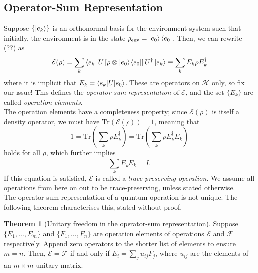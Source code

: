 \documentclass[12pt,a4paper]{report}
\numberwithin{equation}{section}
\newcommand{\ketbra}[2]{\ket{#1}\bra{#2}}
\newcommand{\ketbras}[1]{\ketbra{#1}{#1}}
\theoremstyle{definition}
\theoremstyle{theorem}
\newtheorem{theorem}{Theorem}[section]
\theoremstyle{theorem}
\theoremstyle{example}
\theoremstyle{definition}
\begin{document}
\subsection{Operator-Sum Representation}
Suppose $\{\ket{e_{k}}\}$ is an orthonormal basis for the environment system such that initially, the environment is in the state $\rho_{\text{env}}=\ketbras{e_{0}}$. Then, we can rewrite (??) as
\begin{equation}
	\mathcal{E}(\rho)=\sum_{k}\bra{e_{k}}U\left[\rho\otimes\ketbras{e_{0}}\right]U^{\dagger}\ket{e_{k}}\equiv\sum_{k}E_{k}\rho E_{k}^{\dagger}
\end{equation}
where it is implicit that $E_{k}=\braket{e_{k}|U|e_{0}}$. These are operators on $\mathcal{H}$ only, so fix our issue! This defines the \textit{operator-sum representation} of $\mathcal{E}$, and the set $\{E_{k}\}$ are called \textit{operation elements}.\\
The operation elements have a completeness property; since $\mathcal{E}(\rho)$ is itself a density operator, we must have $\text{Tr}(\mathcal{E}(\rho))=1$, meaning that
\begin{equation}
	1=\text{Tr}\left(\sum_{k}\rho E_{k}^{\dagger}\right)=\text{Tr}\left(\sum_{k}\rho E_{k}^{\dagger}E_{k}\right)
\end{equation}
holds for all $\rho$, which further implies
\begin{equation}
	\sum_{k}E_{k}^{\dagger}E_{k}=I.
\end{equation}
If this equation is satisfied, $\mathcal{E}$ is called a \textit{trace-preserving operation}. We assume all operations from here on out to be trace-preserving, unless stated otherwise.\\
The operator-sum representation of a quantum operation is not unique. The following theorem characterises this, stated without proof.
\begin{theorem}[Unitary freedom in the operator-sum representation]
	Suppose $\{E_{1},\ldots,E_{m}\}$ and $\{F_{1},\ldots,F_{n}\}$ are operation elements of operations $\mathcal{E}$ and $\mathcal{F}$ respectively. Append zero operators to the shorter list of elements to ensure $m=n$. Then, $\mathcal{E}=\mathcal{F}$ if and only if $E_{i}=\sum_{j}u_{ij}F_{j}$, where $u_{ij}$ are the elements of an $m\times m$ unitary matrix.
\end{theorem}
\end{document}
